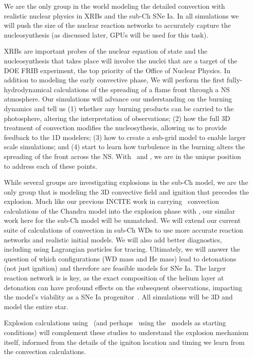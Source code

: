 \documentclass[11pt,letterpaper,english]{article}
\begin{document}
We are the only group in the world modeling the detailed convection
with realistic nuclear physics in XRBs and the sub-Ch SNe Ia.  In all
simulations we will push the size of the nuclear reaction networks to
accurately capture the nucleosynthesis (as discussed later, GPUs will
be used for this task).  

XRBs are important probes of the nuclear equation of state and the
nucleosynthesis that takes place will involve the nuclei that are a
target of the DOE FRIB experiment, the top priority of the Office of
Nuclear Physics.  In addition to modeling the early convective phase,
We will perform the first fully-hydrodynamical calculations of the
spreading of a flame front through a NS atmosphere.  Our simulations
will advance our understanding on the burning dynamics and tell us (1)
whether any burning products can be carried to the photosphere,
altering the interpretation of observations; (2) how the full 3D
treatment of convection modifies the nucleosythesis, allowing us to
provide feedback to the 1D modelers; (3) how to create a sub-grid
model to enable larger scale simulations; and (4) start to learn how
turbulence in the burning alters the spreading of the front across the
NS.  With \maestro\ and \castro, we are in the unique
position to address each of these points.

While several groups are investigating explosions in the sub-Ch model,
we are the only group that is modeling the 3D convective field and
ignition that precedes the explosion.  Much like our previous INCITE
work in carrying \maestro\ convection calculations of the Chandra
model into the explosion phase with \castro, our similar work here for
the sub-Ch model will be unmatched.  We will extend our current suite
of calculations of convection in sub-Ch WDs to use more accurate
reaction networks and realistic initial models.  We will also add
better diagnostics, including using Lagrangian particles for tracing.
Ultimately, we will answer the question of which configurations (WD
mass and He mass) lead to detonations (not just ignition) and
therefore are feasible models for SNe Ia.  The larger reaction network
is is key, as the exact composition of the helium layer at detonation
can have profound effects on the subsequent observations, impacting
the model's viability as a SNe Ia progenitor~\cite{kromer:2010}.  All
simulations will be 3D and model the entire star.

Explosion calculations using \flash\ (and perhaps \castro\ using the
\maestro\ models as starting conditions) will complement these studies
to understand the explosion mechanism itself, informed from the
details of the igniton location and timing we learn from the
convection calculations.
 
\end{document}
